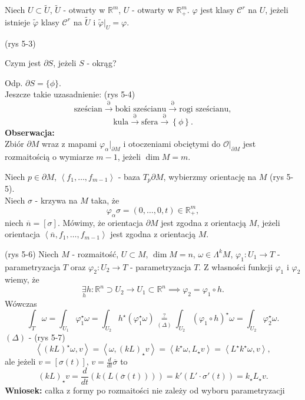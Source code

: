 \documentclass[../main.tex]{subfiles}
\begin{document}
\begin{definicja}
    Niech $U\subset \tilde U$, $\tilde U$ - otwarty w $\mathbb{R}^m$, $U$ - otwarty w $\mathbb{R}^m_+$. $\varphi$ jest klasy $\mathcal{C}^r$ na $U$, jeżeli istnieje $\tilde \varphi$ klasy $\mathcal{C}^r$ na $\tilde U$ i $\tilde \varphi|_U = \varphi$.
\end{definicja}
(rys 5-3)
\begin{pytanie}
    Czym jest $\partial S$, jeżeli $S$ - okrąg?
\end{pytanie}
Odp. $\partial S = \{\phi\}$.\\
Jeszcze takie uzasadnienie: (rys 5-4)
\[
    \text{sześcian} \overset{\partial}{\to} \text{boki sześcianu} \overset{\partial}{\to} \text{rogi sześcianu}
,\]
\[
    \text{kula} \overset{\partial}{\to} \text{sfera} \overset{\partial}{\to} \left\{ \phi \right\}
.\]
\textbf{Obserwacja:}\\
Zbiór $\partial M$ wraz z mapami $\varphi_\alpha|_{\partial M}$ i otoczeniami obciętymi do $\mathcal{O}|_{\partial M}$ jest rozmaitością o wymiarze $m-1$, jeżeli $\dim M = m$.\\
\begin{definicja}
Niech  $p\in \partial M$, $\left<f_1,\ldots,f_{m-1} \right>$ - baza $ T_p\partial M$, wybierzmy orientację na $M$ (rys 5-5).\\
Niech $\sigma$ - krzywa na $M$ taka, że
\[
    \varphi_\alpha\sigma =  \left( 0,\ldots,0,t \right) \in\mathbb{R}^m_+
,\]
niech $\overline{n} = \left[ \sigma \right] $. Mówimy, że orientacja $\partial M$ jest zgodna z orientacją $M$, jeżeli orientacja $\left<\overline{n}, f_1,\ldots,f_{m-1} \right>$ jest zgodna z orientacją $M$.
\end{definicja}
(rys 5-6)
Niech $M$ - rozmaitość, $U\subset M$, $\dim M = n$, $\omega\in \Lambda^kM$,  $\varphi_1: U_1\to T$ - parametryzacja $T$ oraz $\varphi_2: U_2\to T$ - parametryzacja $T$. Z własności funkcji  $\varphi_1$ i $\varphi_2$ wiemy, że
\[
\underset{h}{\exists} h: \mathbb{R}^n \supset U_2\to U_1\subset\mathbb{R}^n \implies \varphi_2 = \varphi_1\circ h
.\]
Wówczas
\[
    \int_{T}\omega = \int_{U_1}\varphi_1^\star \omega = \int_{U_2}h^\star\left( \varphi_1^\star\omega \right) \underset{(\Delta)}{\overset{\text{?}}{=}} \int_{U_2}(\varphi_1\circ h)^\star\omega = \int_{U_2}\varphi_2^\star\omega
.\]
    $(\Delta)$ - (rys 5-7)
    \[
        \left<(kL)^\star\omega, v \right> = \left<\omega, (kL)_\star v \right> = \left<k^\star \omega, L_\star v \right> = \left<L^\star k^\star \omega, v \right>
    ,\]
ale jeżeli $v = \left[ \sigma(t) \right]$, $v = \frac{d}{dt}\overline{\sigma}$ to
\[
    (kL)_\star v = \frac{d}{dt}\left( k\left( L\left( \overline{\sigma}(t) \right)  \right)  \right) = k'(L'\cdot \sigma'(t)) = k_\star L_\star v
.\]
\textbf{Wniosek:} całka z formy po rozmaitości nie zależy od wyboru parametryzacji
\end{document}
